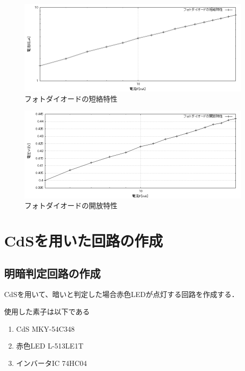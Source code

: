 \documentclass[titlepage]{jarticle}
\begin{document}
\newpage

\begin{figure}[H]
    \begin{center}
        \includegraphics[width=12cm]{graph/2.PNG}
        \caption{フォトダイオードの短絡特性}
        \label{fig:フォトダイオードの短絡特性}
    \end{center}
\end{figure}

\begin{figure}[H]
    \begin{center}
        \includegraphics[width=12cm]{graph/3.PNG}
        \caption{フォトダイオードの開放特性}
        \label{fig:フォトダイオードの開放特性}
    \end{center}
\end{figure}

\section{CdSを用いた回路の作成}
\subsection{明暗判定回路の作成}
CdSを用いて、暗いと判定した場合赤色LEDが点灯する回路を作成する．

使用した素子は以下である
\begin{enumerate}
    \item CdS MKY-54C348
    \item 赤色LED L-513LE1T
    \item インバータIC 74HC04
\end{enumerate}
\end{document}
